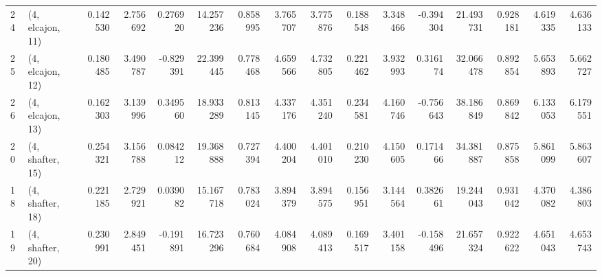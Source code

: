\begin{tabular}{llrrrrrrrrrrrrrr}
24 &  (4, elcajon, 11) &   0.142530 &  2.756692 &  0.276920 &  14.257236 &  0.858995 &   3.765707 &  3.775876 &  0.188548 &  3.348466 & -0.394304 &   21.493731 &  0.928181 &   4.619335 &   4.636133 \\
25 &  (4, elcajon, 12) &   0.180485 &  3.490787 & -0.829391 &  22.399445 &  0.778468 &   4.659566 &  4.732805 &  0.221462 &  3.932993 &  0.316174 &   32.066478 &  0.892854 &   5.653893 &   5.662727 \\
26 &  (4, elcajon, 13) &   0.162303 &  3.139996 &  0.349560 &  18.933289 &  0.813145 &   4.337176 &  4.351240 &  0.234581 &  4.160746 & -0.756643 &   38.186849 &  0.869842 &   6.133053 &   6.179551 \\
20 &  (4, shafter, 15) &   0.254321 &  3.156788 &  0.084212 &  19.368888 &  0.727394 &   4.400204 &  4.401010 &  0.210230 &  4.150605 &  0.171466 &   34.381887 &  0.875858 &   5.861099 &   5.863607 \\
18 &  (4, shafter, 18) &   0.221185 &  2.729921 &  0.039082 &  15.167718 &  0.783024 &   3.894379 &  3.894575 &  0.156951 &  3.144564 &  0.382661 &   19.244043 &  0.931042 &   4.370082 &   4.386803 \\
19 &  (4, shafter, 20) &   0.230991 &  2.849451 & -0.191891 &  16.723296 &  0.760684 &   4.084908 &  4.089413 &  0.169517 &  3.401158 & -0.158496 &   21.657324 &  0.922622 &   4.651043 &   4.653743 \\
\bottomrule
\end{tabular}
